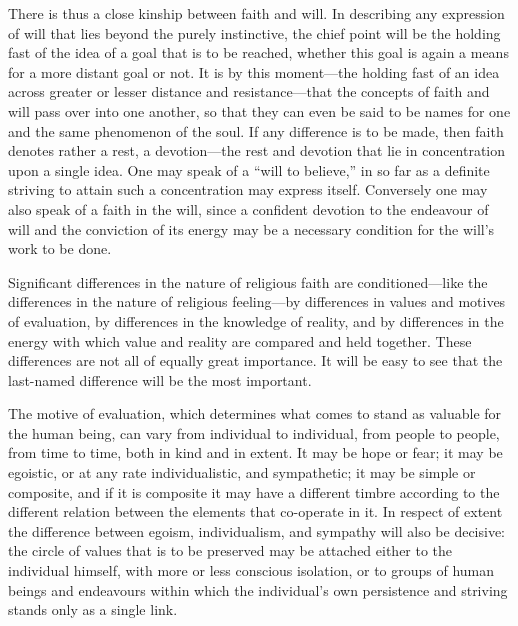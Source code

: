 \documentclass[12pt,a4paper]{book}
\newcommand{\opage}[1]{\marginnote{\footnotesize\textit{[#1]}}}
\begin{document}
There is thus a close kinship between faith and will. In describing any
expression of will that lies beyond the purely instinctive, the chief point will
be the holding fast of the idea of a goal that is to be reached, whether this
goal is again a means for a more distant goal or not. It is by this
moment---the holding fast of an idea across greater or lesser distance and
resistance---that the concepts of faith and will pass over into one another, so
that they can even be said to be names for one and the same phenomenon of the
soul. If any difference is to be made, then faith denotes rather a rest, a
devotion---the rest and devotion that lie in concentration upon a single idea.
One may speak of a ``will to believe,'' in so far as a definite striving to
attain such a concentration may express itself. Conversely one may also speak of
a faith in the will, since a confident devotion to the endeavour of will and the
conviction of its energy may be a necessary condition for the will's work to be
done.


Significant differences in the nature of religious faith are conditioned---like
the differences in the nature of religious feeling---by differences in values
and motives of 
\opage{72}evaluation, by differences in the knowledge of reality, and by
differences in the energy with which value and reality are compared and held
together. These differences are not all of equally great importance. It will be
easy to see that the last-named difference will be the most important.

The motive of evaluation, which determines what comes to stand as valuable for
the human being, can vary from individual to individual, from people to people,
from time to time, both in kind and in extent. It may be hope or fear; it may be
egoistic, or at any rate individualistic, and sympathetic; it may be simple or
composite, and if it is composite it may have a different timbre according to
the different relation between the elements that co-operate in it. In respect of
extent the difference between egoism, individualism, and sympathy will also be
decisive: the circle of values that is to be preserved may be attached either to
the individual himself, with more or less conscious isolation, or to groups of
human beings and endeavours within which the individual's own persistence and
striving stands only as a single link.
\end{document}
